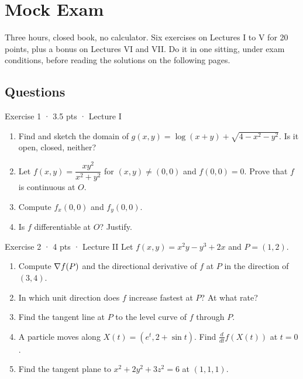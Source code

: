 \chapter{Mock Exam}\label{ch:mock}

\begin{examnote}
Three hours, closed book, no calculator. Six exercises on Lectures I to V for 20 points, plus a
bonus on Lectures VI and VII. Do it in one sitting, under exam conditions, before reading the
solutions on the following pages.
\end{examnote}

\section*{Questions}

\begin{problem}{Exercise 1 · 3.5 pts · Lecture I}
\begin{enumerate}[label=(\alph*)]
  \item Find and sketch the domain of $g(x,y)=\log(x+y)+\sqrt{4-x^2-y^2}$. Is it open, closed, neither?
  \item Let $f(x,y)=\dfrac{xy^2}{x^2+y^2}$ for $(x,y)\ne(0,0)$ and $f(0,0)=0$. Prove that $f$ is continuous at $O$.
  \item Compute $f_x(0,0)$ and $f_y(0,0)$.
  \item Is $f$ differentiable at $O$? Justify.
\end{enumerate}
\end{problem}

\begin{problem}{Exercise 2 · 4 pts · Lecture II}
Let $f(x,y)=x^2y-y^3+2x$ and $P=(1,2)$.
\begin{enumerate}[label=(\alph*)]
  \item Compute $\nabla f(P)$ and the directional derivative of $f$ at $P$ in the direction of $(3,4)$.
  \item In which unit direction does $f$ increase fastest at $P$? At what rate?
  \item Find the tangent line at $P$ to the level curve of $f$ through $P$.
  \item A particle moves along $X(t)=(e^t,2+\sin t)$. Find $\frac{d}{dt}f(X(t))$ at $t=0$.
  \item Find the tangent plane to $x^2+2y^2+3z^2=6$ at $(1,1,1)$.
\end{enumerate}
\end{problem}

